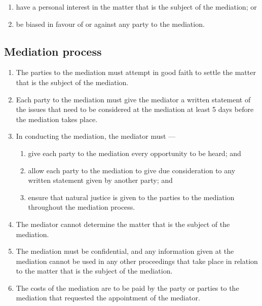 \documentclass[../constitution.tex]{subfiles}
\begin{document}
\begin{enumerate}
  \begin{enumerate}
  
  \item have a personal interest in the matter that is the subject of the mediation; or
  \item be biased in favour of or against any party to the mediation.
  \end{enumerate}
\end{enumerate}

\hypertarget{mediation-process}{%
\subsection{Mediation process}\label{mediation-process}}

\begin{enumerate}

\item The parties to the mediation must attempt in good faith to settle the matter that is the subject of the mediation.
\item Each party to the mediation must give the mediator a written statement of the issues that need to be considered at the mediation at least 5 days before the mediation takes place.
\item In conducting the mediation, the mediator must ---

  \begin{enumerate}
  
  \item give each party to the mediation every opportunity to be heard; and
  \item allow each party to the mediation to give due consideration to any written statement given by another party; and
  \item ensure that natural justice is given to the parties to the mediation throughout the mediation process.
  \end{enumerate}
\item The mediator cannot determine the matter that is the subject of the mediation.
\item The mediation must be confidential, and any information given at the mediation cannot be used in any other proceedings that take place in relation to the matter that is the subject of the mediation.
\item The costs of the mediation are to be paid by the party or parties to the mediation that requested the appointment of the mediator.
\end{enumerate}
\end{document}
